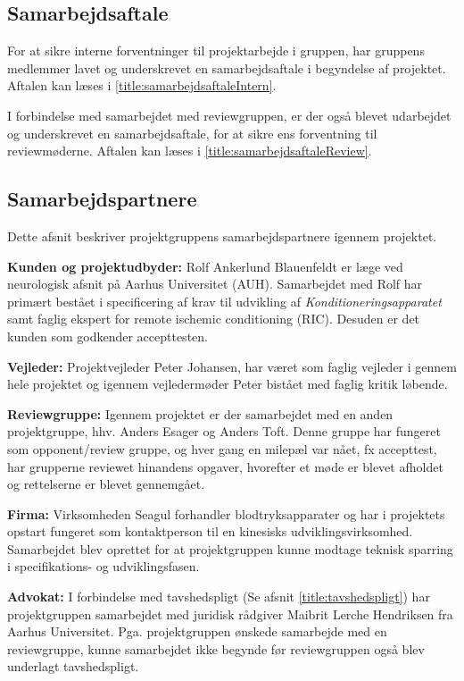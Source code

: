 \subsection{Samarbejdsaftale}
For at sikre interne forventninger til projektarbejde i gruppen, har gruppens medlemmer lavet og underskrevet en samarbejdsaftale i begyndelse af projektet. Aftalen kan læses i \ref{title:samarbejdsaftaleIntern}.

I forbindelse med samarbejdet med reviewgruppen, er der også blevet udarbejdet og underskrevet en samarbejdsaftale, for at sikre ens forventning til reviewmøderne. Aftalen kan læses i \ref{title:samarbejdsaftaleReview}.

\subsection{Samarbejdspartnere} \label{title:samarbejdspartnere}
Dette afsnit beskriver projektgruppens samarbejdspartnere igennem projektet. 

\textbf{Kunden og projektudbyder:} Rolf Ankerlund Blauenfeldt er læge ved neurologisk afsnit på Aarhus Universitet (AUH). Samarbejdet med Rolf har primært bestået i specificering af krav til udvikling af \textit{Konditioneringsapparatet} samt faglig ekspert for remote ischemic conditioning (RIC). Desuden er det kunden som godkender accepttesten.

\textbf{Vejleder:} Projektvejleder Peter Johansen, har været som faglig vejleder i gennem hele projektet og igennem vejledermøder Peter bistået med faglig kritik løbende. 

\textbf{Reviewgruppe:} Igennem projektet er der samarbejdet med en anden projektgruppe, hhv. Anders Esager og Anders Toft. Denne gruppe har fungeret som opponent/review gruppe, og hver gang en milepæl var nået, fx accepttest, har grupperne reviewet hinandens opgaver, hvorefter et møde er blevet afholdet og rettelserne er blevet gennemgået.  

\textbf{Firma:} Virksomheden Seagul forhandler blodtryksapparater og har i projektets opstart fungeret som kontaktperson til en kinesisks udviklingsvirksomhed. Samarbejdet blev oprettet for at projektgruppen kunne modtage teknisk sparring i specifikations- og udviklingsfasen. 

\textbf{Advokat:} I forbindelse med tavshedspligt (Se afsnit \ref{title:tavshedspligt}) har projektgruppen samarbejdet med juridisk rådgiver Maibrit Lerche Hendriksen fra Aarhus Universitet. Pga. projektgruppen ønskede samarbejde med en reviewgruppe, kunne samarbejdet ikke begynde før reviewgruppen også blev underlagt tavshedspligt.

